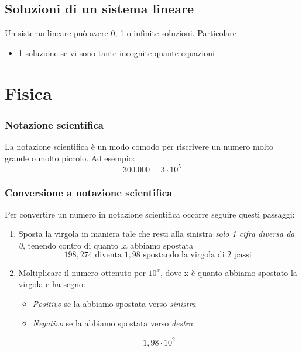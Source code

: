 \subsection{Soluzioni di un sistema lineare}
Un sistema lineare può avere 0, 1 o infinite soluzioni. Particolare
\begin{itemize}
	\item 1 soluzione se vi sono tante incognite quante equazioni
\end{itemize}

\section{Fisica}
\subsubsection*{Notazione scientifica}
La notazione scientifica è un modo comodo per riscrivere un numero molto grande o molto piccolo. Ad esempio:
\[
	300.000 = 3 \cdot 10 ^{5}
\]
\subsubsection*{Conversione a notazione scientifica}
Per convertire un numero in notazione scientifica occorre seguire questi passaggi:
\begin{enumerate}
	\item Sposta la virgola in maniera tale che resti alla sinistra \textit{solo 1 cifra diversa da 0}, tenendo contro di quanto la abbiamo spostata
	      \[
		      198,274 \text{ diventa } 1,98 \text{ spostando la virgola di } 2 \text{ passi }
	      \]
	\item Moltiplicare il numero ottenuto per $ 10^x $, dove x è quanto abbiamo spostato la virgola e ha segno:
	      \begin{itemize}
		      \item \textit{Positivo} se la abbiamo spostata verso \textit{sinistra}
		      \item \textit{Negativo} se la abbiamo spostata verso \textit{destra}
	      \end{itemize}
	      \[
		      1,98 \cdot 10 ^{2}
	      \]
\end{enumerate}
